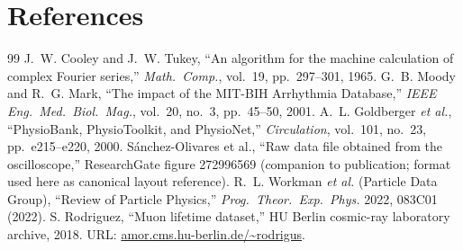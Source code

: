 \documentclass[11pt,a4paper,openany]{book}
\begin{document}
\chapter{References}
\begin{thebibliography}{99}
 J.~W. Cooley and J.~W. Tukey, ``An algorithm for the machine calculation of complex Fourier series,'' \emph{Math.\ Comp.}, vol.~19, pp.~297--301, 1965.
 G.~B. Moody and R.~G. Mark, ``The impact of the MIT-BIH Arrhythmia Database,'' \emph{IEEE Eng.\ Med.\ Biol.\ Mag.}, vol.~20, no.~3, pp.~45--50, 2001.
 A.~L. Goldberger \emph{et al.}, ``PhysioBank, PhysioToolkit, and PhysioNet,'' \emph{Circulation}, vol.~101, no.~23, pp.~e215--e220, 2000.
 S\'{a}nchez-Olivares et al., ``Raw data file obtained from the oscilloscope,'' ResearchGate figure 272996569 (companion to publication; format used here as canonical layout reference).
 R.~L. Workman \emph{et al.} (Particle Data Group), ``Review of Particle Physics,'' \emph{Prog.\ Theor.\ Exp.\ Phys.} 2022, 083C01 (2022).
 S. Rodriguez, ``Muon lifetime dataset,'' HU Berlin cosmic-ray laboratory archive, 2018. URL: \url{amor.cms.hu-berlin.de/~rodrigus}.


\end{thebibliography}
\end{document}
